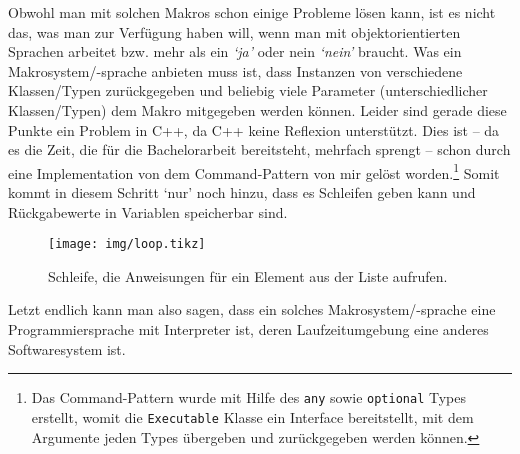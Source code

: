   Obwohl man mit solchen Makros schon einige Probleme lösen kann, ist es nicht das, was man zur Verfügung haben will, wenn man mit objektorientierten Sprachen arbeitet bzw. mehr als ein \textit{`ja'} oder nein \textit{`nein'} braucht. Was ein Makrosystem/-sprache anbieten muss ist, dass Instanzen von verschiedene Klassen/Typen zurückgegeben und beliebig viele Parameter (unterschiedlicher Klassen/Typen) dem Makro mitgegeben werden können. Leider sind gerade diese Punkte ein Problem in C++, da C++ keine Reflexion unterstützt. Dies ist -- da es die Zeit, die für die Bachelorarbeit bereitsteht, mehrfach sprengt -- schon durch eine Implementation von dem Command-Pattern von mir gelöst worden.\footnote{
    Das Command-Pattern wurde mit Hilfe des \texttt{any}
    sowie \texttt{optional}
    Types erstellt, womit die \texttt{Executable} Klasse ein Interface bereitstellt, mit dem Argumente jeden Types übergeben und zurückgegeben werden können.
  }\spewnotes{}
  Somit kommt in diesem Schritt `nur' noch hinzu, dass es Schleifen geben kann und Rückgabewerte in Variablen speicherbar sind.

  \begin{figure}[H]
    \centering
    \texttt{[image: img/loop.tikz]}
    \caption{Schleife, die Anweisungen für ein Element aus der Liste aufrufen.}
  \end{figure}

  Letzt endlich kann man also sagen, dass ein solches Makrosystem/-sprache eine Programmiersprache mit Interpreter ist, deren Laufzeitumgebung eine anderes Softwaresystem ist.

